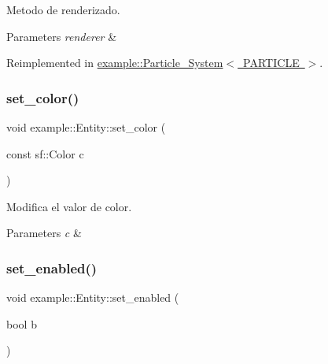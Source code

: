 Metodo de renderizado. 


\begin{DoxyParams}{Parameters}
{\em renderer} & \\
\hline
\end{DoxyParams}


Reimplemented in \mbox{\hyperlink{classexample_1_1_particle___system_aed070ca0042af0428dd942fe4f1e0241}{example\+::\+Particle\+\_\+\+System$<$ P\+A\+R\+T\+I\+C\+L\+E $>$}}.

\mbox{\label{classexample_1_1_entity_a290e01f28b2d6f738d21372145a108ed}} 
\subsubsection{\texorpdfstring{set\_color()}{set\_color()}}
{\footnotesize\ttfamily void example\+::\+Entity\+::set\+\_\+color (\begin{DoxyParamCaption}\item[{const sf\+::\+Color}]{c }\end{DoxyParamCaption})\hspace{0.3cm}{\ttfamily [inline]}}



Modifica el valor de color. 


\begin{DoxyParams}{Parameters}
{\em c} & \\
\hline
\end{DoxyParams}
\mbox{\label{classexample_1_1_entity_aa36de06895a962d04571610424ebd68e}} 
\subsubsection{\texorpdfstring{set\_enabled()}{set\_enabled()}}
{\footnotesize\ttfamily void example\+::\+Entity\+::set\+\_\+enabled (\begin{DoxyParamCaption}\item[{bool}]{b }\end{DoxyParamCaption})\hspace{0.3cm}{\ttfamily [inline]}}



